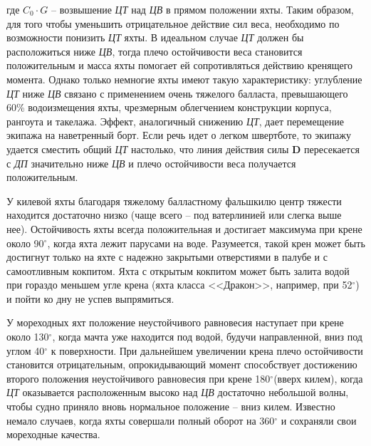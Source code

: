 \documentclass[a4paper, 12pt, twoside, final, book, russian, fittopage, cyremdash]{ncc}
\newcommand{\ve}[1]{\ensuremath{\mathbf{#1}}\xspace}
\newcommand{\gr}{\ensuremath{^\circ}\xspace}
\begin{document}
где $C_0 \cdot G$ \--- возвышение \textit{ЦТ} над \textit{ЦВ} в прямом положении яхты. Таким образом, для того чтобы уменьшить отрицательное действие сил веса, необходимо по возможности понизить \textit{ЦТ} яхты. В идеальном случае \textit{ЦТ} должен бы расположиться ниже \textit{ЦВ}, тогда плечо остойчивости веса становится положительным и масса яхты помогает ей сопротивляться действию кренящего момента. Однако только немногие яхты имеют такую характеристику: углубление \textit{ЦТ} ниже \textit{ЦВ} связано с применением очень тяжелого балласта, превышающего 60\% водоизмещения яхты, чрезмерным облегчением конструкции корпуса, рангоута и такелажа. Эффект, аналогичный снижению \textit{ЦТ}, дает перемещение экипажа на наветренный борт. Если речь идет о легком швертботе, то экипажу удается сместить общий \textit{ЦТ} настолько, что линия действия силы \ve D пересекается с \textit{ДП} значительно ниже \textit{ЦВ} и плечо остойчивости веса получается положительным.

У килевой яхты благодаря тяжелому балластному фальшкилю центр тяжести находится достаточно низко (чаще всего \--- под ватерлинией или слегка выше нее). Остойчивость яхты всегда положительная и достигает максимума при крене около 90\gr, когда яхта лежит парусами на воде. Разумеется, такой крен может быть достигнут только на яхте с надежно закрытыми отверстиями в палубе и с самоотливным кокпитом. Яхта с открытым кокпитом может быть залита водой при гораздо меньшем угле крена (яхта класса <<Дракон>>, например, при 52\gr) и пойти ко дну не успев выпрямиться.

У мореходных яхт положение неустойчивого равновесия наступает при крене около 130\gr, когда мачта уже находится под водой, будучи направленной, вниз под углом 40\gr к поверхности. При дальнейшем увеличении крена плечо остойчивости становится отрицательным, опрокидывающий момент способствует достижению второго положения неустойчивого равновесия при крене 180\gr (вверх килем), когда \textit{ЦТ} оказывается расположенным высоко над \textit{ЦВ} достаточно небольшой волны, чтобы судно приняло вновь нормальное положение \--- вниз килем. Известно немало случаев, когда яхты совершали полный оборот на 360\gr и сохраняли свои мореходные качества. 
\end{document}
